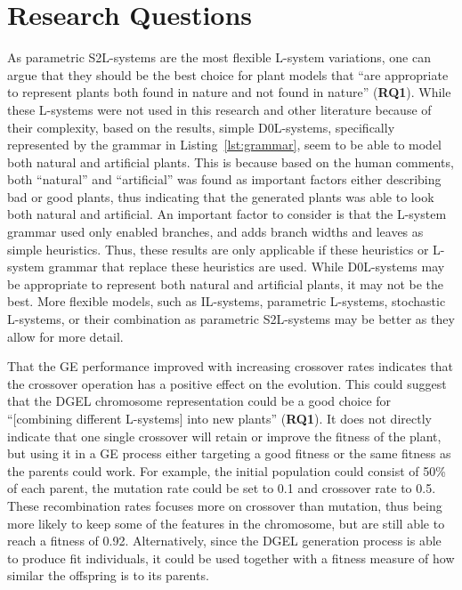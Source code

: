 \section{Research Questions}
As parametric S2L-systems are the most flexible L-system variations, one can argue that they should be the best choice for plant models that ``are appropriate to represent plants both found in nature and not found in nature'' (\textbf{RQ1}).
While these L-systems were not used in this research and other literature because of their complexity, based on the results, simple D0L-systems, specifically represented by the grammar in Listing~\ref{lst:grammar}, seem to be able to model both natural and artificial plants.
This is because based on the human comments, both ``natural'' and ``artificial'' was found as important factors either describing bad or good plants, thus indicating that the generated plants was able to look both natural and artificial.
An important factor to consider is that the L-system grammar used only enabled branches, and adds branch widths and leaves as simple heuristics.
Thus, these results are only applicable if these heuristics or L-system grammar that replace these heuristics are used.
While D0L-systems may be appropriate to represent both natural and artificial plants, it may not be the best.
More flexible models, such as IL-systems, parametric L-systems, stochastic L-systems, or their combination as parametric S2L-systems may be better as they allow for more detail.

That the GE performance improved with increasing crossover rates indicates that the crossover operation has a positive effect on the evolution.
This could suggest that the DGEL chromosome representation could be a good choice for ``[combining different L-systems] into new plants'' (\textbf{RQ1}).
It does not directly indicate that one single crossover will retain or improve the fitness of the plant, but using it in a GE process either targeting a good fitness or the same fitness as the parents could work.
For example, the initial population could consist of 50\% of each parent, the mutation rate could be set to 0.1 and crossover rate to 0.5.
These recombination rates focuses more on crossover than mutation, thus being more likely to keep some of the features in the chromosome, but are still able to reach a fitness of 0.92.
Alternatively, since the DGEL generation process is able to produce fit individuals, it could be used together with a fitness measure of how similar the offspring is to its parents.


